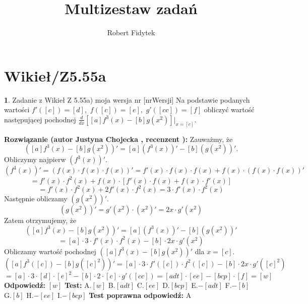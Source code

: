 \documentclass[12pt, a4paper]{article}
\title{Multizestaw zadań}
\author{Robert Fidytek}
\date{}
\theoremstyle{definition} %
\newtheorem{zad}{}
\newcommand{\kategoria}[1]{\section{#1}} %
\newcommand{\zadStart}[1]{\begin{zad}#1\newline} %
\newcommand{\zadStop}{\end{zad}}   %
\newcommand{\rozwStart}[2]{\noindent \textbf{Rozwiązanie (autor #1 , recenzent #2): }\newline} %
\newcommand{\rozwStop}{\newline}                                            %
\newcommand{\odpStart}{\noindent \textbf{Odpowiedź:}\newline}    %
\newcommand{\odpStop}{\newline}                                             %
\newcommand{\testStart}{\noindent \textbf{Test:}\newline} %
\newcommand{\testStop}{\newline} %
\newcommand{\kluczStart}{\noindent \textbf{Test poprawna odpowiedź:}\newline} %
\newcommand{\kluczStop}{\newline} %
\begin{document}
\maketitle


\kategoria{Wikieł/Z5.55a}
\zadStart{Zadanie z Wikieł Z 5.55a) moja wersja nr [nrWersji]}
Na podstawie podanych wartości $f'([c])=[d],$ $f([c])=[e],$ $g'([cc])=[f]$ obliczyć wartość następującej pochodnej $\frac{d}{dx}\left[[a]f^{3}(x)-[b]g(x^{2})\right]|_{x=[c]}$.
\zadStop
\rozwStart{Justyna Chojecka}{}
Zauważmy, że 
$$\left([a]f^{3}(x)-[b]g(x^{2})\right)'=[a]\left(f^{3}(x)\right)'-[b]\left(g(x^{2})\right)'.$$
Obliczymy najpierw $\left(f^{3}(x)\right)'$.
$$\left(f^{3}(x)\right)'=\left(f(x)\cdot f(x) \cdot f(x)\right)'=f'(x)\cdot f(x)\cdot f(x)+f(x)\cdot \left(f(x)\cdot f(x)\right)'$$$$=f'(x)\cdot f^{2}(x)+f(x)\cdot \left[f'(x)\cdot f(x)+f(x)\cdot f'(x)\right]$$$$=f'(x)\cdot f^{2}(x)+2f'(x)\cdot f^{2}(x)=3\cdot f'(x)\cdot f^{2}(x)$$
Następnie obliczamy $\left(g(x^{2})\right)'$.
$$\left(g(x^{2})\right)'=g'(x^{2})\cdot (x^{2})'=2x\cdot g'(x^{2})$$
Zatem otrzymujemy, że 
$$\left([a]f^{3}(x)-[b]g(x^{2})\right)'=[a]\left(f^{3}(x)\right)'-[b]\left(g(x^{2})\right)'$$$$=[a]\cdot 3\cdot f'(x)\cdot f^{2}(x)-[b]\cdot 2x\cdot g'(x^{2})$$
Obliczamy wartość pochodnej $\left([a]f^{3}(x)-[b]g(x^{2})\right)'$ dla $x=[c]$.
$$\left([a]f^{3}([c])-[b]g([c]^{2})\right)'=[a]\cdot 3 \cdot f'([c])\cdot f^{2}([c])-[b]\cdot 2x\cdot g'([c]^{2})$$$$=[a]\cdot 3 \cdot [d]\cdot [e]^{2}-[b]\cdot 2\cdot [c]\cdot g'([cc])=[adt]\cdot [ee]-[bcp]\cdot [f]=[w]$$
\rozwStop
\odpStart
$[w]$
\odpStop
\testStart
A.$[w]$
B.$[adt]$
C.$[ee]$
D.$[bcp]$
E.$-[adt]$
F.$-[b]$
G.$[b]$
H.$-[ee]$
I.$-[bcp]$
\testStop
\kluczStart
A
\kluczStop
\end{document}
